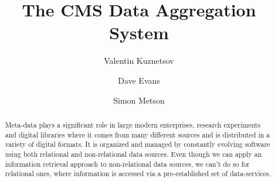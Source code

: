 \documentclass[1p,times]{elsarticle}
\begin{document}
\begin{frontmatter}




\title{The CMS Data Aggregation System}


\author[vkuznet]{Valentin Kuznetsov}
\address[vkuznet]{Cornell University, Ithaca, New York, USA}

\author[evans]{Dave Evans}
\address[evans]{Fermilab, Batavia, Illinois, USA}

\author[metson]{Simon Metson}
\address[metson]{Bristol University, Bristol, UK}


\begin{abstract}
Meta-data plays a significant role in large modern enterprises, 
research experiments and digital libraries where it comes from many different 
sources and is distributed in a variety of digital formats. 
It is organized and managed by constantly evolving software using 
both relational and non-relational data sources. Even though we can apply
an information retrieval approach to non-relational data sources,
we can't do so for relational ones, where information is accessed via
a pre-established set of data-services.


\end{abstract}
\end{frontmatter}
\end{document}
